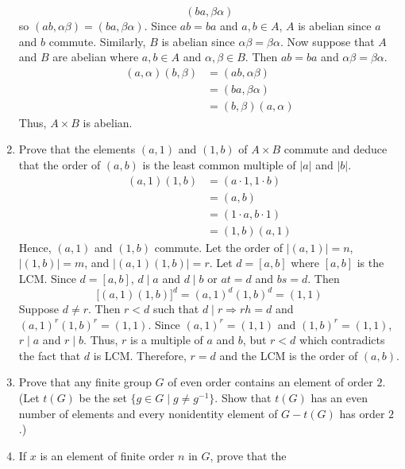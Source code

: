 \begin{enumerate}
\[  (ba, \beta\alpha)
  \]
  so \((ab, \alpha\beta) = (ba, \beta\alpha)\).
  Since \(ab = ba\) and \(a,b\in A\), \(A\) is abelian since \(a\) and \(b\)
  commute.
  Similarly, \(B\) is abelian since \(\alpha\beta = \beta\alpha\).
  Now suppose that \(A\) and \(B\) are abelian where \(a,b\in A\) and
  \(\alpha,\beta\in B\).
  Then \(ab = ba\) and \(\alpha\beta = \beta\alpha\).
  \begin{align*}
    (a, \alpha)(b, \beta) & = (ab, \alpha\beta)\\
                          & = (ba, \beta\alpha)
                            \tag{since \(A\) and \(B\) are abelian}\\
                          & = (b, \beta)(a, \alpha)
  \end{align*}
  Thus, \(A\times B\) is abelian.
\item
  Prove that the elements \((a, 1)\) and \((1, b)\) of \(A\times B\) commute
  and deduce that the order of \((a, b)\) is the least common multiple of
  \(\lvert a\rvert\) and \(\lvert b\rvert\).
  \begin{align*}
    (a, 1)(1, b) & = (a\cdot 1, 1\cdot b)\\
                 & = (a, b)\\
                 & = (1\cdot a, b\cdot 1)\\
                 & = (1, b)(a, 1)
  \end{align*}
  Hence, \((a, 1)\) and \((1, b)\) commute.
  Let the order of \(\lvert (a, 1)\rvert = n\), \(\lvert (1, b)\rvert = m\),
  and \(\lvert (a, 1)(1, b)\rvert = r\).
  Let \(d = [a, b]\) where \([a, b]\) is the LCM.
  Since \(d = [a, b]\), \(d\mid a\) and \(d\mid b\) or \(at = d\) and
  \(bs = d\).
  Then
  \[
  \bigl[(a, 1)(1, b)\bigr]^d = (a, 1)^d(1, b)^d = (1, 1)
  \]
  Suppose \(d\neq r\).
  Then \(r < d\) such that \(d\mid r\Rightarrow rh = d\) and
  \((a, 1)^r(1, b)^r = (1, 1)\).
  Since \((a, 1)^r = (1, 1)\) and \((1, b)^r = (1, 1)\), \(r\mid a\) and
  \(r\mid b\).
  Thus, \(r\) is a multiple of \(a\) and \(b\), but \(r < d\) which contradicts
  the fact that \(d\) is LCM.
  Therefore, \(r = d\) and the LCM is the order of \((a, b)\).
\item
  Prove that any finite group \(G\) of even order contains an element of order
  \(2\).
  (Let \(t(G)\) be the set \(\{g\in G\mid g\neq g^{-1}\}\).
  Show that \(t(G)\) has an even number of elements and every nonidentity
  element of \(G - t(G)\) has order \(2\).)
\item
  If \(x\) is an element of finite order \(n\) in \(G\), prove that the

\end{enumerate}

